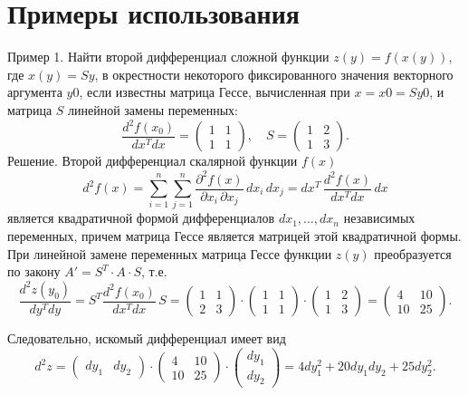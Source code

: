 \documentclass[bachelor, och, coursework, times]{SCWorks}
\newcommand\tab[1][1cm]{\hspace*{#1}}
\begin{document}
\section{Примеры использования}
\tab Пример 1. Найти второй дифференциал сложной функции $z(y)=f(x(y))$, где $x(y)=Sy$, в окрестности некоторого фиксированного значения векторного аргумента $y0$, если известны матрица Гессе, вычисленная при $x=x0=Sy0$, и матрица $S$
линейной замены переменных:
$$\frac{d^2f(x_0)}{dx^Tdx}
=\begin{pmatrix}
1&1\\
1&1
\end{pmatrix}\!,\quad 
S=
\begin{pmatrix}
1&2\\
1&3
\end{pmatrix}\!.$$
Решение. Второй дифференциал скалярной функции $f(x)$
$$d^2f(x)=\sum_{i=1}^{n}\sum_{j=1}^{n}\frac{\partial^2f(x)}{\partial x_i\,\partial x_j}\,dx_i\,dx_j= dx^T\,\frac{d^2f(x)}{dx^Tdx}\,dx$$
является квадратичной формой дифференциалов $dx_1,…,dx_n$
независимых переменных, причем матрица Гессе является матрицей этой квадратичной формы. При линейной замене переменных матрица Гессе функции $z(y)$ преобразуется по закону $A'=S^T\cdot A\cdot S$, т.е.
$$\frac{d^2z(y_0)}{dy^Tdy}= S^T\frac{d^2f(x_0)}{dx^Tdx}\,S= \begin{pmatrix}
1&1\\
2&3
\end{pmatrix}\!\cdot\! 
\begin{pmatrix}
1&1\\
1&1
\end{pmatrix}\!\cdot\! 
\begin{pmatrix} 
1&2\\
1&3
\end{pmatrix} = 
\begin{pmatrix} 
4&10\\
10&25
\end{pmatrix}\!.$$

Следовательно, искомый дифференциал имеет вид
$$d^2z=
\begin{pmatrix}
dy_1&dy_2
\end{pmatrix}\!\cdot\! 
\begin{pmatrix}
4&10\\
10&25 
\end{pmatrix}\!\cdot\! 
\begin{pmatrix}dy_1\\dy_2\end{pmatrix}= 4dy_1^2+20dy_1dy_2+25dy_2^2.$$
\end{document}
